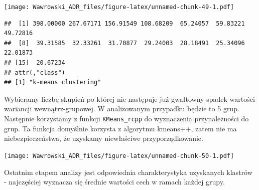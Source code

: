 \documentclass[]{book}
\newenvironment{Shaded}{\begin{snugshade}}{\end{snugshade}}
\newcommand{\DataTypeTok}[1]{\textcolor[rgb]{0.13,0.29,0.53}{#1}}
\newcommand{\DecValTok}[1]{\textcolor[rgb]{0.00,0.00,0.81}{#1}}
\newcommand{\KeywordTok}[1]{\textcolor[rgb]{0.13,0.29,0.53}{\textbf{#1}}}
\newcommand{\NormalTok}[1]{#1}
\newcommand{\OperatorTok}[1]{\textcolor[rgb]{0.81,0.36,0.00}{\textbf{#1}}}
\newcommand{\StringTok}[1]{\textcolor[rgb]{0.31,0.60,0.02}{#1}}
\begin{document}
\texttt{[image: Wawrowski\_ADR\_files/figure-latex/unnamed-chunk-49-1.pdf]}

\begin{verbatim}
##  [1] 398.00000 267.67171 156.91549 108.68209  65.24057  59.83221  49.72816
##  [8]  39.31585  32.33261  31.70877  29.24003  28.18491  25.34096  22.01873
## [15]  20.67234
## attr(,"class")
## [1] "k-means clustering"
\end{verbatim}

Wybieramy liczbę skupień po której nie następuje już gwałtowny spadek wartości wariancji wewnątrz-grupowej. W analizowanym przypadku będzie to 5 grup. Następnie korzystamy z funkcji \texttt{KMeans\_rcpp} do wyznaczenia przynależności do grup. Ta funkcja domyślnie korzysta z algorytmu kmeans++, zatem nie ma niebezpieczeństwa, że uzyskamy niewłaściwe przyporządkowanie.

\begin{Shaded}
\end{Shaded}

\texttt{[image: Wawrowski\_ADR\_files/figure-latex/unnamed-chunk-50-1.pdf]}

Ostatnim etapem analizy jest odpowiednia charakterystyka uzyskanych klastrów - najczęściej wyznacza się średnie wartości cech w ramach każdej grupy.

\begin{Shaded}
\end{Shaded}
\end{document}
